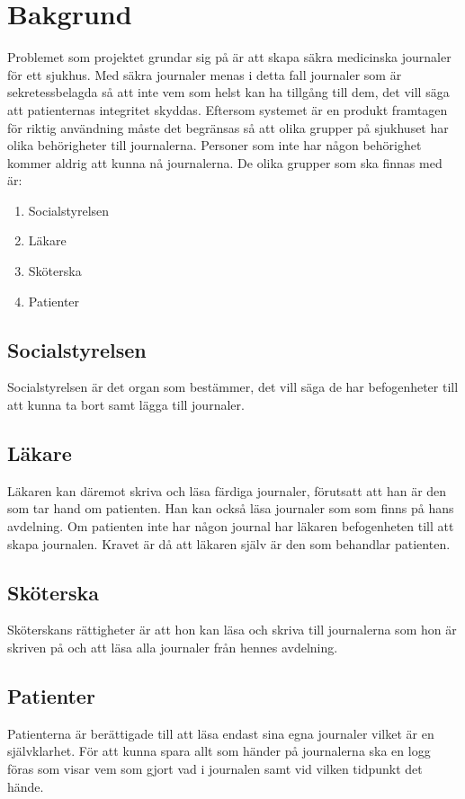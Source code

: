 \section{Bakgrund}

Problemet som projektet grundar sig på är att skapa säkra medicinska journaler för ett sjukhus. Med säkra journaler menas i detta fall  journaler som är sekretessbelagda så att inte vem som helst kan ha tillgång till dem, det vill säga att patienternas integritet skyddas. Eftersom systemet är en produkt framtagen för riktig användning måste det begränsas så att olika grupper på sjukhuset har olika behörigheter till journalerna. Personer som inte har någon behörighet kommer aldrig att kunna nå journalerna. De olika grupper som ska finnas med är:

\begin{enumerate}
\item{Socialstyrelsen}
\item{Läkare}
\item{Sköterska}
\item{Patienter}
\end{enumerate} 


\subsection{Socialstyrelsen}
Socialstyrelsen är det organ som bestämmer, det vill säga de har befogenheter till att kunna ta bort samt lägga till journaler. 

\subsection{Läkare}
Läkaren kan däremot skriva och läsa färdiga journaler, förutsatt att han är den som tar hand om patienten. Han kan också läsa journaler som som finns på hans avdelning. Om patienten inte har någon journal har läkaren befogenheten till att skapa journalen. Kravet är då att läkaren själv är den som behandlar patienten.

\subsection{Sköterska}
Sköterskans rättigheter är att hon kan läsa och skriva till journalerna som hon är skriven på och att läsa alla journaler från hennes avdelning.

\subsection{Patienter}
Patienterna är berättigade till att läsa endast sina egna journaler vilket är en självklarhet.
För att kunna spara allt som händer på journalerna ska en logg föras som visar vem som gjort vad i journalen samt vid vilken tidpunkt det hände.